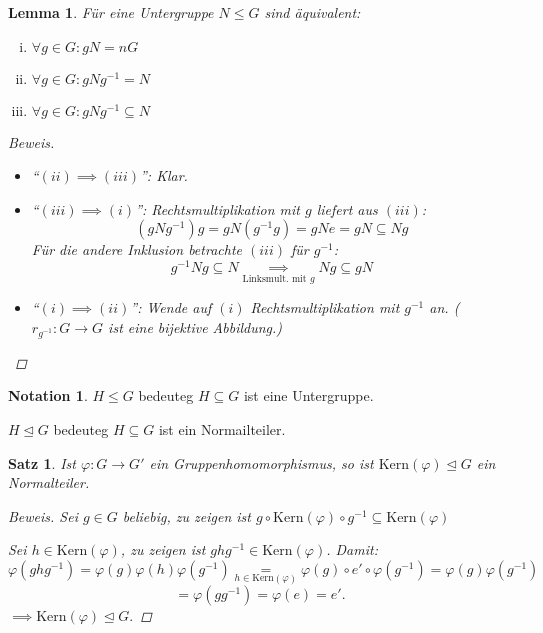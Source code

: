 \documentclass[a4paper]{report}
\theoremstyle{plain}
\newtheorem{lemm}[thm]{Lemma}
\newtheorem{satz}[thm]{Satz}
\theoremstyle{definition}
\newtheorem*{nota*}{Notation}
\begin{document}
\begin{lemm}
  Für eine Untergruppe $N \le G$ sind äquivalent:
  \begin{enumerate}[(i)]
    \item $\forall g \in G : gN = nG$
    \item $\forall g \in G : gNg^{-1} = N$
    \item $\forall g \in G : gNg^{-1} \subseteq N$
  \end{enumerate}
  \begin{proof}[Beweis]
\begin{itemize}
\item ``$(ii)\implies (iii)$'': Klar.
  \item ``$(iii)\implies (i)$'': Rechtsmultiplikation mit $g$ liefert aus $(iii)$:
        $$(gNg^{-1})g = gN(g^{-1}g) = gNe = gN \subseteq Ng$$
        Für die andere Inklusion betrachte $(iii)$ für $g^{-1}$:
        $$g^{-1}Ng \subseteq N \underset{\text{Linksmult. mit }g}\implies Ng \subseteq gN$$
\item ``$(i)\implies (ii)$'': Wende auf $(i)$ Rechtsmultiplikation mit $g^{-1}$ an. ($r_{g^{-1}}: G \to G$ ist eine bijektive Abbildung.)
\end{itemize}
  \end{proof}
\end{lemm}

\begin{nota*}
  \item $H \le G$ bedeuteg $H \subseteq G$ ist eine Untergruppe.
  \item $H \trianglelefteq G$ bedeuteg $H \subseteq G$ ist ein Normailteiler.
\end{nota*}

\begin{satz}
  Ist $\varphi : G \to G'$ ein Gruppenhomomorphismus, so ist $\mathrm{Kern}(\varphi) \trianglelefteq G$ ein Normalteiler.
  \begin{proof}[Beweis]
    Sei $g \in G$ beliebig, zu zeigen ist $g \circ \mathrm{Kern}(\varphi) \circ g^{-1} \subseteq \mathrm{Kern}(\varphi)$
    \item Sei $h \in \mathrm{Kern}(\varphi)$, zu zeigen ist $ghg^{-1} \in \mathrm{Kern}(\varphi)$.
    Damit:
    $$\varphi(ghg^{-1}) = \varphi(g)\varphi(h)\varphi(g^{-1}) \underset{h \in \mathrm{Kern}(\varphi)} = \varphi(g) \circ e' \circ \varphi(g^{-1}) = \varphi(g)\varphi(g^{-1})$$
    $$= \varphi(gg^{-1}) = \varphi(e) = e'.$$
    $\implies \mathrm{Kern}(\varphi) \trianglelefteq G.$
  \end{proof}
\end{satz}
\end{document}
